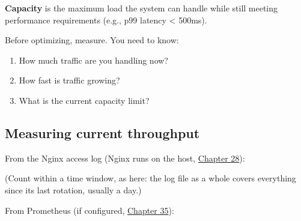 \textbf{Capacity} is the maximum load the system can handle while still meeting performance requirements (e.g., p99 latency \textless{} 500ms).

Before optimizing, measure. You need to know:

\begin{enumerate}
\def\labelenumi{\arabic{enumi}.}
\tightlist
\item
  How much traffic are you handling now?
\item
  How fast is traffic growing?
\item
  What is the current capacity limit?
\end{enumerate}

\subsection*{Measuring current throughput}\label{36-scaling-load:measuring-current-throughput}

From the Nginx access log (Nginx runs on the host, \hyperref[ch:28-traffic-routing]{Chapter 28}):

\begin{codebox}[short]

\begin{Shaded}
\begin{Highlighting}[]
\KeywordTok{|} \DataTypeTok{\textbackslash{}}
    \KeywordTok{|}   \KeywordTok{|}  \KeywordTok{|}   \KeywordTok{|}  
\CommentTok{\#   583 [15/Jan/2024:14:01}
\CommentTok{\#   611 [15/Jan/2024:14:02}
\end{Highlighting}
\end{Shaded}

\end{codebox}

\noindent{}(Count within a time window, as here: the log file as a whole covers everything since its last rotation, usually a day.)

From Prometheus (if configured, \hyperref[ch:35-observability]{Chapter 35}):

